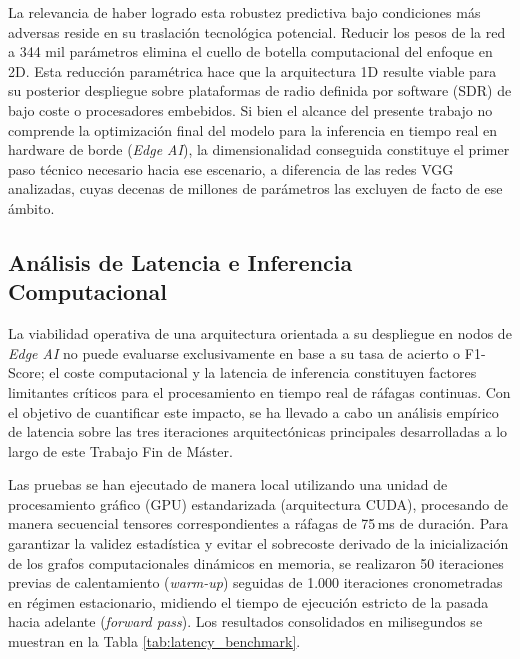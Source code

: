 La relevancia de haber logrado esta robustez predictiva bajo condiciones más adversas reside en su traslación tecnológica potencial. Reducir los pesos de la red a 344 mil parámetros elimina el cuello de botella computacional del enfoque en 2D. Esta reducción paramétrica hace que la arquitectura 1D resulte viable para su posterior despliegue sobre plataformas de radio definida por software (SDR) de bajo coste o procesadores embebidos. Si bien el alcance del presente trabajo no comprende la optimización final del modelo para la inferencia en tiempo real en hardware de borde (\textit{Edge AI}), la dimensionalidad conseguida constituye el primer paso técnico necesario hacia ese escenario, a diferencia de las redes VGG analizadas, cuyas decenas de millones de parámetros las excluyen de facto de ese ámbito.

\subsection{Análisis de Latencia e Inferencia Computacional}
\label{subsec:latencia_inferencia}

La viabilidad operativa de una arquitectura orientada a su despliegue en nodos de \textit{Edge AI} no puede evaluarse exclusivamente en base a su tasa de acierto o F1-Score; el coste computacional y la latencia de inferencia constituyen factores limitantes críticos para el procesamiento en tiempo real de ráfagas continuas. Con el objetivo de cuantificar este impacto, se ha llevado a cabo un análisis empírico de latencia sobre las tres iteraciones arquitectónicas principales desarrolladas a lo largo de este Trabajo Fin de Máster.

Las pruebas se han ejecutado de manera local utilizando una unidad de procesamiento gráfico (GPU) estandarizada (arquitectura CUDA), procesando de manera secuencial tensores correspondientes a ráfagas de 75\,ms de duración. Para garantizar la validez estadística y evitar el sobrecoste derivado de la inicialización de los grafos computacionales dinámicos en memoria, se realizaron 50 iteraciones previas de calentamiento (\textit{warm-up}) seguidas de 1.000 iteraciones cronometradas en régimen estacionario, midiendo el tiempo de ejecución estricto de la pasada hacia adelante (\textit{forward pass}). Los resultados consolidados en milisegundos se muestran en la Tabla \ref{tab:latency_benchmark}.

